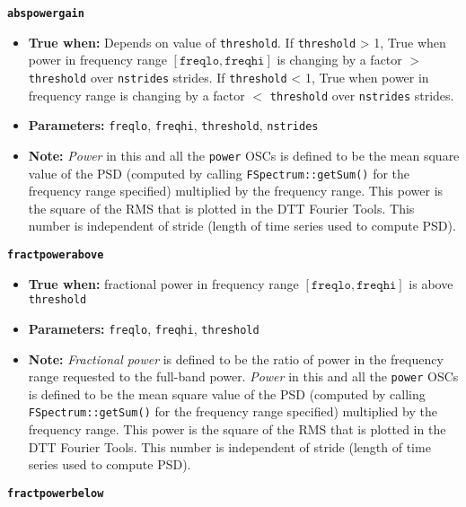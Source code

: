 \documentclass[11pt]{article}
\begin{document}
{\large\texttt{\textbf{abspowergain}}}
\begin{itemize}
\item \textbf{True when:} Depends on value of \texttt{threshold}.  If
  \texttt{threshold} > 1, True when power in frequency range
  $[\mathtt{freqlo}, \mathtt{freqhi}]$ is changing by a factor $>$
  \texttt{threshold} over \texttt{nstrides} strides.  If
  \texttt{threshold} < 1, True when power in frequency range is
  changing by a factor $<$ \texttt{threshold} over \texttt{nstrides}
  strides. 
\item \textbf{Parameters:} \texttt{freqlo}, \texttt{freqhi},
  \texttt{threshold}, \texttt{nstrides}
\item \textbf{Note:} \textit{Power} in this and all the \texttt{power}
  OSCs is defined to be the mean square value of the PSD
  (computed by calling \texttt{FSpectrum::getSum()} for the
  frequency range specified) multiplied by the frequency range.  This
  power is the square of the RMS that is plotted in the DTT Fourier
  Tools. This number is independent of stride (length of time series
  used to compute PSD). 
\end{itemize}

{\large\texttt{\textbf{fractpowerabove}}}

\begin{itemize}
\item \textbf{True when:} fractional power in frequency range
  $[\mathtt{freqlo}, \mathtt{freqhi}]$ is above \texttt{threshold}
\item \textbf{Parameters:} \texttt{freqlo}, \texttt{freqhi}, \texttt{threshold}
\item \textbf{Note:} \textit{Fractional power} is defined to be the
  ratio of power in the frequency range requested to the full-band
  power.  \textit{Power} in this and all the \texttt{power}
  OSCs is defined to be the mean square value of the PSD
  (computed by calling \texttt{FSpectrum::getSum()} for the
  frequency range specified) multiplied by the frequency range. This
  power is the square of the RMS that is plotted in the DTT Fourier
  Tools. This number is independent of stride (length of time series
  used to compute PSD). 
\end{itemize}


{\large\texttt{\textbf{fractpowerbelow}}}
\end{document}
